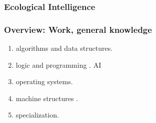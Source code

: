 \begin{frame}
\frametitle{Ecological Intelligence} 
\end{frame} 

%


\begin{frame}[label=ovviewGenknow]
\frametitle{Overview: Work, general knowledge}
\begin{enumerate} 
\small \item \small algorithms and data structures. 
\item \small logic and programming . AI
\item \small operating systems. 
\item \small machine structures . 
\item \small specialization. 
\end{enumerate}
\end{frame} 

